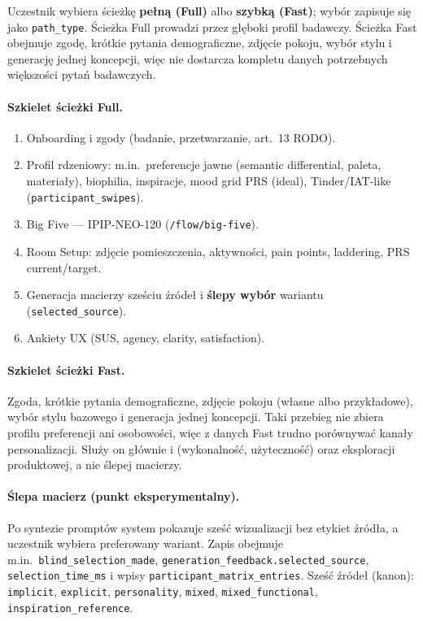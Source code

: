 Uczestnik wybiera ścieżkę \textbf{pełną (Full)} albo \textbf{szybką (Fast)}; wybór zapisuje się jako \texttt{path\_type}. Ścieżka Full prowadzi przez głęboki profil badawczy. Ścieżka Fast obejmuje zgodę, krótkie pytania demograficzne, zdjęcie pokoju, wybór stylu i generację jednej koncepcji, więc nie dostarcza kompletu danych potrzebnych większości pytań badawczych.

\paragraph{Szkielet ścieżki Full.}
\begin{enumerate}
  \item Onboarding i zgody (badanie, przetwarzanie, art.~13 RODO).
  \item Profil rdzeniowy: m.in.\ preferencje jawne (semantic differential, paleta, materiały), biophilia, inspiracje, mood grid PRS (ideal), Tinder/IAT-like (\texttt{participant\_swipes}).
  \item Big Five --- IPIP-NEO-120 (\texttt{/flow/big-five}).
  \item Room Setup: zdjęcie pomieszczenia, aktywności, pain points, laddering, PRS current/target.
  \item Generacja macierzy sześciu źródeł i \textbf{ślepy wybór} wariantu (\texttt{selected\_source}).
  \item Ankiety UX (SUS, agency, clarity, satisfaction).
\end{enumerate}

\paragraph{Szkielet ścieżki Fast.}
Zgoda, krótkie pytania demograficzne, zdjęcie pokoju (własne albo przykładowe), wybór stylu bazowego i generacja jednej koncepcji. Taki przebieg nie zbiera profilu preferencji ani osobowości, więc z danych Fast trudno porównywać kanały personalizacji. Służy on głównie  i  (wykonalność, użyteczność) oraz eksploracji produktowej, a nie ślepej macierzy.

\paragraph{Ślepa macierz (punkt eksperymentalny).}
Po syntezie promptów system pokazuje sześć wizualizacji bez etykiet źródła, a uczestnik wybiera preferowany wariant. Zapis obejmuje m.in.\ \texttt{blind\_selection\_made}, \texttt{generation\_feedback.selected\_source}, \texttt{selection\_time\_ms} i wpisy \texttt{participant\_matrix\_entries}. Sześć źródeł (kanon): \texttt{implicit}, \texttt{explicit}, \texttt{personality}, \texttt{mixed}, \texttt{mixed\_functional}, \texttt{inspiration\_reference}.


